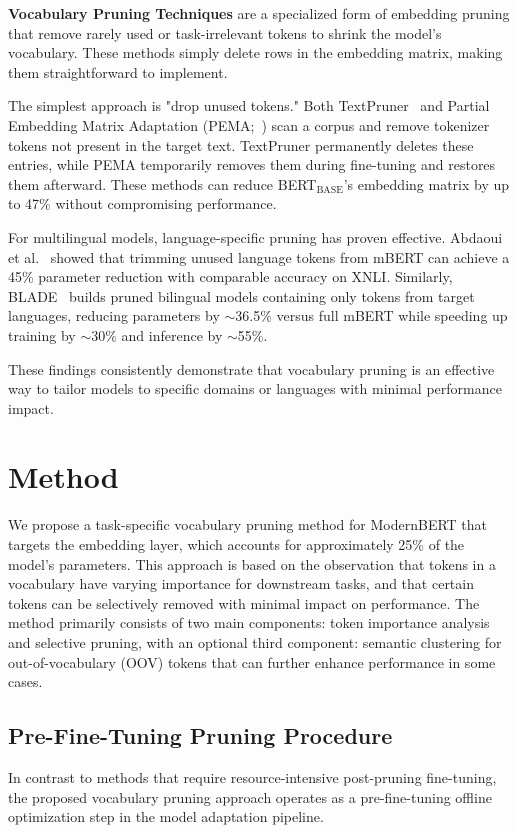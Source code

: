 \documentclass[twocolumn]{article}
\begin{document}
\textbf{Vocabulary Pruning Techniques} are a specialized form of embedding pruning that remove rarely used or task-irrelevant tokens to shrink the model's vocabulary. These methods simply delete rows in the embedding matrix, making them straightforward to implement.

The simplest approach is "drop unused tokens." Both TextPruner~\cite{shen2022textpruner} and Partial Embedding Matrix Adaptation (PEMA;~\cite{bousquet2023pema}) scan a corpus and remove tokenizer tokens not present in the target text. TextPruner permanently deletes these entries, while PEMA temporarily removes them during fine-tuning and restores them afterward. These methods can reduce BERT$_{\text{BASE}}$'s embedding matrix by up to 47\% without compromising performance.

For multilingual models, language-specific pruning has proven effective. Abdaoui et al.~\cite{abdaoui2020load} showed that trimming unused language tokens from mBERT can achieve a 45\% parameter reduction with comparable accuracy on XNLI. Similarly, BLADE~\cite{nair2023blade} builds pruned bilingual models containing only tokens from target languages, reducing parameters by $\sim$36.5\% versus full mBERT while speeding up training by $\sim$30\% and inference by $\sim$55\%.

These findings consistently demonstrate that vocabulary pruning is an effective way to tailor models to specific domains or languages with minimal performance impact.


\section{Method}
We propose a task-specific vocabulary pruning method for ModernBERT that targets the embedding layer, which accounts for approximately 25\% of the model's parameters. This approach is based on the observation that tokens in a vocabulary have varying importance for downstream tasks, and that certain tokens can be selectively removed with minimal impact on performance. The method primarily consists of two main components: token importance analysis and selective pruning, with an optional third component: semantic clustering for out-of-vocabulary (OOV) tokens that can further enhance performance in some cases.

\subsection{Pre-Fine-Tuning Pruning Procedure}
In contrast to methods that require resource-intensive post-pruning fine-tuning, the proposed vocabulary pruning approach operates as a pre-fine-tuning offline optimization step in the model adaptation pipeline. 
\end{document}
